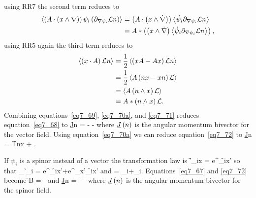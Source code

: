 using RR7 the second term reduces to 
\begin{align}
	\left \langle {\left ({A\cdot\left ({x\wedge\nabla} \right )} \right )\psi_{i}\left ({\partial_{\nabla\psi_{i}}\mathcal{L}n} \right )} \right \rangle_{} 
		&= \left ( {A\cdot\left ( {x\wedge\dot{\nabla}} \right )} \right )\left \langle {\dot{\psi}_{i}\partial_{\nabla\psi_{i}}\mathcal{L}n} \right \rangle_{} \nonumber \\
		&= A*\left ( {\left ( {x\wedge\dot{\nabla}} \right )\left \langle {\dot{\psi}_{i}\partial_{\nabla\psi_{i}}\mathcal{L}n} \right \rangle_{}} \right ), \label{eq7_70a}
\end{align}
using RR5 again the third term reduces to 
\begin{align}
	\left \langle {\left ({x\cdot A} \right )\mathcal{L}n} \right \rangle_{} &= \displaystyle\frac{1}{2}\left \langle {\left ({xA-Ax} \right )\mathcal{L}n} \right \rangle_{} \nonumber \\
	                              &= \displaystyle\frac{1}{2}\left \langle {A\left ({nx-xn} \right )\mathcal{L}} \right \rangle_{} \nonumber \\
	                              &= \left \langle {A\left ({n\wedge x} \right )\mathcal{L}} \right \rangle_{} \nonumber \\
	                              &= A*\left ( {n\wedge x} \right )\mathcal{L}. \label{eq7_71}
\end{align}
Combining equations~\ref{eq7_69}, \ref{eq7_70a}, and \ref{eq7_71} reduces equation~\ref{eq7_68} to
\be
	\f{\underline{J}}{n} = 
	                      -
	                      -\Lf \label{eq7_72}
\ee
where ${\underline{J}}\left ( {n} \right )$ is the angular momentum bivector for the vector field.  Using equation~\ref{eq7_70a} we can reduce
equation~\ref{eq7_72} to
\be
	\f{\underline{J}}{n} = \f{T}{n}\W x + .
\ee

If $\psi_{i}$ is a spinor instead of a vector the transformation law is
\be
	\f{\psi'_{i}}{x} = e^{}\f{\psi_{i}}{x'}
\ee
so that
\be
	\partial_{\alpha}\psi'_{i} = e^{}\f{\psi_{i}}{x'}+e^{}\partial_{\alpha}x'\f{\psi_{i}}{x'}
\ee
and
\be
	 = \psi_{i}+\cdot\nabla\psi_{i}.
\ee
Equations~\ref{eq7_67} and \ref{eq7_72} become
\be
	\f{}{B} = -\Lf
\ee
and
\be
	\f{\underline{J}}{n} = 
	                      -
	                      -\Lf
\ee
where ${\underline{J}}\left ( {n} \right )$ is the angular momentum bivector for the spinor field.

